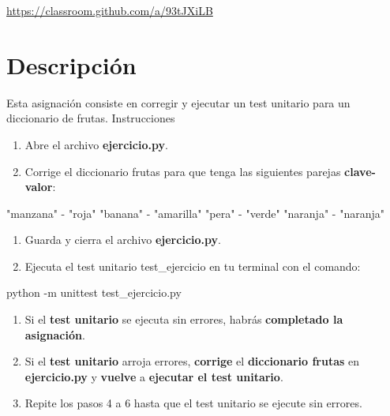 \documentclass[
  a4paper,
  DIV=11,
  numbers=noendperiod,
  onepage,
  openany]{scrreprt}
\newenvironment{Shaded}{\begin{snugshade}}{\end{snugshade}}
\newcommand{\AttributeTok}[1]{\textcolor[rgb]{0.40,0.45,0.13}{#1}}
\newcommand{\CommentTok}[1]{\textcolor[rgb]{0.37,0.37,0.37}{#1}}
\newcommand{\ExtensionTok}[1]{\textcolor[rgb]{0.00,0.23,0.31}{#1}}
\newcommand{\NormalTok}[1]{\textcolor[rgb]{0.00,0.23,0.31}{#1}}
\newcommand{\OperatorTok}[1]{\textcolor[rgb]{0.37,0.37,0.37}{#1}}
\newcommand{\StringTok}[1]{\textcolor[rgb]{0.13,0.47,0.30}{#1}}
\providecommand{\tightlist}{%
  \setlength{\itemsep}{0pt}\setlength{\parskip}{0pt}}\usepackage{longtable,booktabs,array}
\begin{document}
\url{https://classroom.github.com/a/93tJXiLB}

\section{Descripción}\label{descripciuxf3n}

Esta asignación consiste en corregir y ejecutar un test unitario para un
diccionario de frutas. Instrucciones

\begin{enumerate}
\def\labelenumi{\arabic{enumi}.}
\tightlist
\item
  Abre el archivo \textbf{ejercicio.py}.
\item
  Corrige el diccionario frutas para que tenga las siguientes parejas
  \textbf{clave-valor}:
\end{enumerate}

\begin{Shaded}
\begin{Highlighting}[]
\CommentTok{"manzana"} \OperatorTok{{-}} \StringTok{"roja"}
\CommentTok{"banana"} \OperatorTok{{-}} \StringTok{"amarilla"}
\CommentTok{"pera"} \OperatorTok{{-}} \StringTok{"verde"}
\CommentTok{"naranja"} \OperatorTok{{-}} \StringTok{"naranja"}
\end{Highlighting}
\end{Shaded}

\begin{enumerate}
\def\labelenumi{\arabic{enumi}.}
\setcounter{enumi}{2}
\tightlist
\item
  Guarda y cierra el archivo \textbf{ejercicio.py}.
\item
  Ejecuta el test unitario test\_ejercicio en tu terminal con el
  comando:
\end{enumerate}

\begin{Shaded}
\begin{Highlighting}[]
\ExtensionTok{python} \AttributeTok{{-}m}\NormalTok{ unittest test\_ejercicio.py}
\end{Highlighting}
\end{Shaded}

\begin{enumerate}
\def\labelenumi{\arabic{enumi}.}
\setcounter{enumi}{4}
\tightlist
\item
  Si el \textbf{test unitario} se ejecuta sin errores, habrás
  \textbf{completado la asignación}.
\item
  Si el \textbf{test unitario} arroja errores, \textbf{corrige} el
  \textbf{diccionario frutas} en \textbf{ejercicio.py} y \textbf{vuelve}
  a \textbf{ejecutar el test unitario}.
\item
  Repite los pasos 4 a 6 hasta que el test unitario se ejecute sin
  errores.
\end{enumerate}
\end{document}
